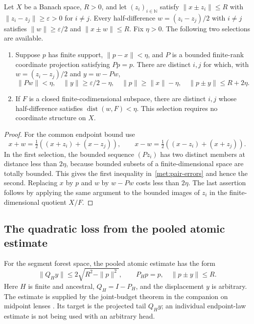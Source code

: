\begin{lemma}\label{met:finite-pair}
Let $X$ be a Banach space, $R>0$, and let $(z_i)_{i\in\mathbb N}$ satisfy
$\|x\pm z_i\|\le R$ with $\|z_i-z_j\|\ge\varepsilon>0$ for $i\ne j$.
Every half-difference $w=(z_i-z_j)/2$ with $i\ne j$ satisfies
$\|w\|\ge\varepsilon/2$ and $\|x\pm w\|\le R$.
Fix $\eta>0$. The following two selections are available.
\begin{enumerate}
\item Suppose $p$ has finite support, $\|p-x\|<\eta$, and $P$ is a bounded
finite-rank coordinate projection satisfying $Pp=p$. There are distinct
$i,j$ for which, with $w=(z_i-z_j)/2$ and $y=w-Pw$,
\begin{equation}\label{met:pair-errors}
 \|Pw\|<\eta,\quad
 \|y\|\ge\varepsilon/2-\eta,\quad
 \|p\|\ge\|x\|-\eta,\quad
\|p\pm y\|\le R+2\eta.
\end{equation}
\item If $F$ is a closed finite-codimensional subspace, there are distinct
$i,j$ whose half-difference satisfies
$\operatorname{dist}(w,F)<\eta$.
This selection requires no coordinate structure on $X$.
\end{enumerate}
\end{lemma}
\begin{proof}
For the common endpoint bound use
\[
 x+w=\tfrac12((x+z_i)+(x-z_j)),\qquad
x-w=\tfrac12((x-z_i)+(x+z_j)).
\]
In the first selection, the bounded sequence $(Pz_i)$ has two distinct
members at distance less than $2\eta$, because bounded subsets of a
finite-dimensional space are totally bounded. This gives the first
inequality in~\eqref{met:pair-errors} and hence the second.
Replacing $x$ by $p$ and $w$ by $w-Pw$ costs less than $2\eta$.
The last assertion follows by applying the same argument to the bounded
images of $z_i$ in the finite-dimensional quotient $X/F$.
\end{proof}

\subsection{The quadratic loss from the pooled atomic estimate}\label{met:joint-section}
For the segment forest space, the pooled atomic estimate has the form
\begin{equation}\label{met:joint-input}
 \|Q_Hy\|\le2\sqrt{R^2-\|p\|^2},
 \qquad P_Hp=p,\quad \|p\pm y\|\le R.
\end{equation}
Here $H$ is finite and ancestral, $Q_H=I-P_H$, and the displacement
$y$ is arbitrary. The estimate is supplied by the joint-budget
theorem in the companion on midpoint lenses
\cite[Theorem~1.1]{SegmentLenses}. Its target is the
projected tail $Q_Hy$; an individual endpoint-law estimate is not being
used with an arbitrary head.

